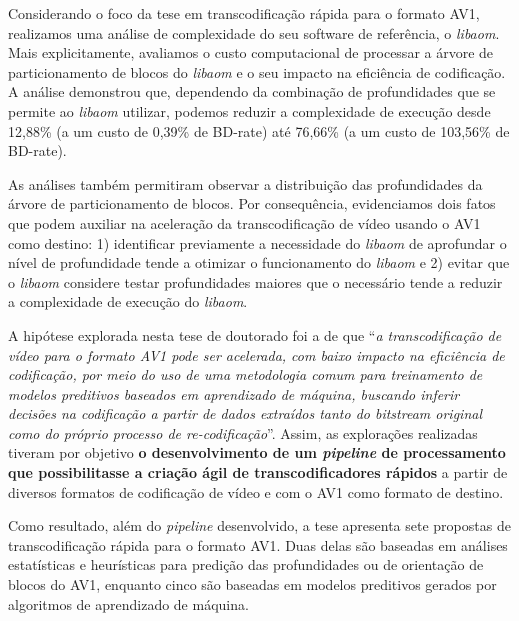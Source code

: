 Considerando o foco da tese em transcodificação rápida para o formato AV1, realizamos uma análise de complexidade do seu software de referência, o \textit{libaom}. Mais explicitamente, avaliamos o custo computacional de processar a árvore de particionamento de blocos do \textit{libaom} e o seu impacto na eficiência de codificação. A análise demonstrou que, dependendo da combinação de profundidades que se permite ao \textit{libaom} utilizar, podemos reduzir a complexidade de execução desde 12,88\% (a um custo de 0,39\% de BD-rate) até 76,66\% (a um custo de 103,56\% de BD-rate).

As análises também permitiram observar a distribuição das profundidades da árvore de particionamento de blocos. Por consequência, evidenciamos dois fatos que podem auxiliar na aceleração da transcodificação de vídeo usando o AV1 como destino: 1) identificar previamente a necessidade do \textit{libaom} de aprofundar o nível de profundidade tende a otimizar o funcionamento do \textit{libaom} e 2) evitar que o \textit{libaom} considere testar profundidades maiores que o necessário tende a reduzir a complexidade de execução do \textit{libaom}.


A hipótese explorada nesta tese de doutorado foi a de que ``\textit{a transcodificação de vídeo para o formato AV1 pode ser acelerada, com baixo impacto na eficiência de codificação, por meio do uso de uma metodologia comum para treinamento de modelos preditivos baseados em aprendizado de máquina, buscando inferir decisões na codificação a partir de dados extraídos tanto do bitstream original como do próprio processo de re-codificação}''. Assim, as explorações realizadas tiveram por objetivo \textbf{o desenvolvimento de um \textit{pipeline} de processamento que possibilitasse a criação ágil de transcodificadores rápidos} a partir de diversos formatos de codificação de vídeo e com o AV1 como formato de destino. 

Como resultado, além do \textit{pipeline} desenvolvido, a tese apresenta sete propostas de transcodificação rápida para o formato AV1. Duas delas são baseadas em análises estatísticas e heurísticas para predição das profundidades ou de orientação de blocos do AV1, enquanto cinco são baseadas em modelos preditivos gerados por algoritmos de aprendizado de máquina.

